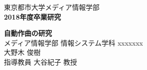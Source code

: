 \documentclass[fleqn,11pt]{jreport}
\begin{document}
\baselineskip 21.5pt

\begin{titlepage}
\vspace*{3cm}
\begin{center}
{\Large\gt 東京都市大学メディア情報学部}\\
\vspace*{0.5cm}
{\Large\bf 2018年度卒業研究}\\
\vspace{1.5cm}

{\huge\bf 自動作曲の研究}\\


\vspace{9cm}
{\Large メディア情報学部 情報システム学科 xxxxxxx}\\
{\Large 大野木 俊樹}\\
\vspace*{0.5cm}
{\Large 指導教員 大谷紀子 教授}\\
\end{center}
\end{titlepage}

\tableofcontents
\cleardoublepage











%


\appendix


\end{document}
